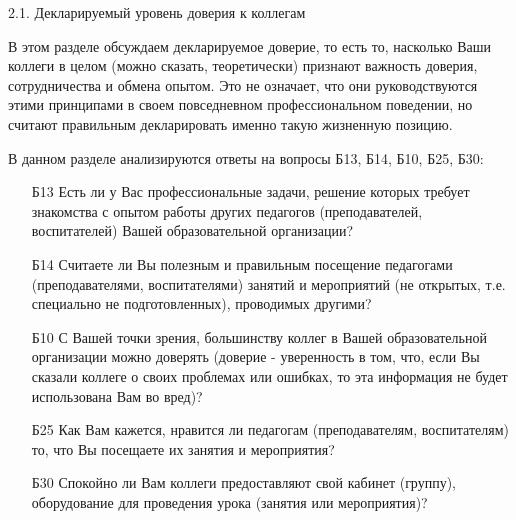\begin{frame}{2.1. Декларируемый уровень доверия к коллегам }

\tiny
В этом разделе обсуждаем декларируемое доверие, то есть то, насколько Ваши коллеги в целом (можно сказать, теоретически) признают важность доверия, сотрудничества и обмена опытом. Это не означает, что они руководствуются этими принципами в своем повседневном профессиональном поведении, но считают правильным декларировать именно такую жизненную позицию.
\bigskip

В данном разделе анализируются ответы на вопросы Б13, Б14, Б10, Б25, Б30:
\bigskip

\begin{itemize}

\item [Б13] Есть ли у Вас профессиональные задачи, решение которых требует знакомства с опытом работы других педагогов (преподавателей, воспитателей) Вашей образовательной организации?

\item [Б14] Считаете ли Вы полезным и правильным посещение педагогами (преподавателями, воспитателями)  занятий и мероприятий (не открытых, т.е. специально не подготовленных), проводимых другими?

\item [Б10] С Вашей точки зрения, большинству коллег в Вашей образовательной организации можно доверять (доверие - уверенность в том, что, если Вы сказали коллеге о своих проблемах или ошибках, то эта информация не будет использована Вам во вред)?

\item[Б25] Как Вам кажется, нравится ли педагогам (преподавателям, воспитателям) то, что Вы посещаете их занятия и мероприятия?

\item[Б30] Спокойно ли Вам коллеги предоставляют свой кабинет (группу), оборудование для проведения урока (занятия или мероприятия)?

\end{itemize}

\end{frame}


